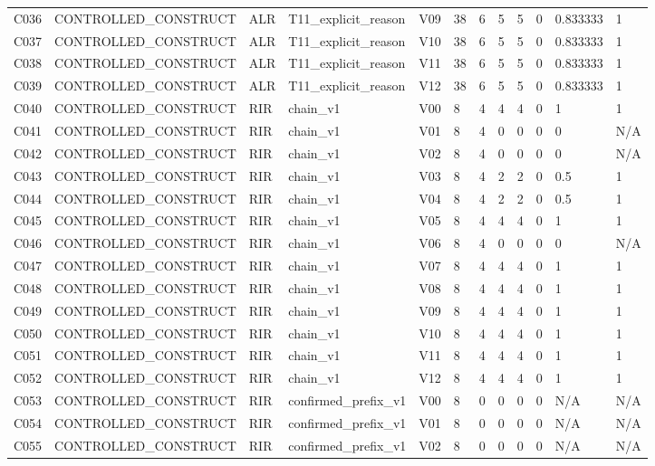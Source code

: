 \begin{longtable}{llllllllllll}
C036 & CONTROLLED\_CONSTRUCT & ALR & T11\_explicit\_reason & V09 & 38 & 6 & 5 & 5 & 0 & 0.833333 & 1 \\
C037 & CONTROLLED\_CONSTRUCT & ALR & T11\_explicit\_reason & V10 & 38 & 6 & 5 & 5 & 0 & 0.833333 & 1 \\
C038 & CONTROLLED\_CONSTRUCT & ALR & T11\_explicit\_reason & V11 & 38 & 6 & 5 & 5 & 0 & 0.833333 & 1 \\
C039 & CONTROLLED\_CONSTRUCT & ALR & T11\_explicit\_reason & V12 & 38 & 6 & 5 & 5 & 0 & 0.833333 & 1 \\
C040 & CONTROLLED\_CONSTRUCT & RIR & chain\_v1 & V00 & 8 & 4 & 4 & 4 & 0 & 1 & 1 \\
C041 & CONTROLLED\_CONSTRUCT & RIR & chain\_v1 & V01 & 8 & 4 & 0 & 0 & 0 & 0 & N/A \\
C042 & CONTROLLED\_CONSTRUCT & RIR & chain\_v1 & V02 & 8 & 4 & 0 & 0 & 0 & 0 & N/A \\
C043 & CONTROLLED\_CONSTRUCT & RIR & chain\_v1 & V03 & 8 & 4 & 2 & 2 & 0 & 0.5 & 1 \\
C044 & CONTROLLED\_CONSTRUCT & RIR & chain\_v1 & V04 & 8 & 4 & 2 & 2 & 0 & 0.5 & 1 \\
C045 & CONTROLLED\_CONSTRUCT & RIR & chain\_v1 & V05 & 8 & 4 & 4 & 4 & 0 & 1 & 1 \\
C046 & CONTROLLED\_CONSTRUCT & RIR & chain\_v1 & V06 & 8 & 4 & 0 & 0 & 0 & 0 & N/A \\
C047 & CONTROLLED\_CONSTRUCT & RIR & chain\_v1 & V07 & 8 & 4 & 4 & 4 & 0 & 1 & 1 \\
C048 & CONTROLLED\_CONSTRUCT & RIR & chain\_v1 & V08 & 8 & 4 & 4 & 4 & 0 & 1 & 1 \\
C049 & CONTROLLED\_CONSTRUCT & RIR & chain\_v1 & V09 & 8 & 4 & 4 & 4 & 0 & 1 & 1 \\
C050 & CONTROLLED\_CONSTRUCT & RIR & chain\_v1 & V10 & 8 & 4 & 4 & 4 & 0 & 1 & 1 \\
C051 & CONTROLLED\_CONSTRUCT & RIR & chain\_v1 & V11 & 8 & 4 & 4 & 4 & 0 & 1 & 1 \\
C052 & CONTROLLED\_CONSTRUCT & RIR & chain\_v1 & V12 & 8 & 4 & 4 & 4 & 0 & 1 & 1 \\
C053 & CONTROLLED\_CONSTRUCT & RIR & confirmed\_prefix\_v1 & V00 & 8 & 0 & 0 & 0 & 0 & N/A & N/A \\
C054 & CONTROLLED\_CONSTRUCT & RIR & confirmed\_prefix\_v1 & V01 & 8 & 0 & 0 & 0 & 0 & N/A & N/A \\
C055 & CONTROLLED\_CONSTRUCT & RIR & confirmed\_prefix\_v1 & V02 & 8 & 0 & 0 & 0 & 0 & N/A & N/A \\

\end{longtable}
